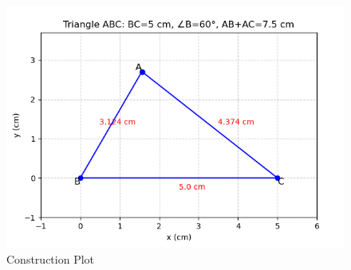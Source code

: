 \documentclass[journal]{IEEEtran}
\begin{document}
\begin{figure}[H]
    \centering
    \includegraphics[width=1.0\linewidth]{figs/image.png}
    \caption{Construction Plot}
    \label{fig:placeholder}
\end{figure}
\end{document}
